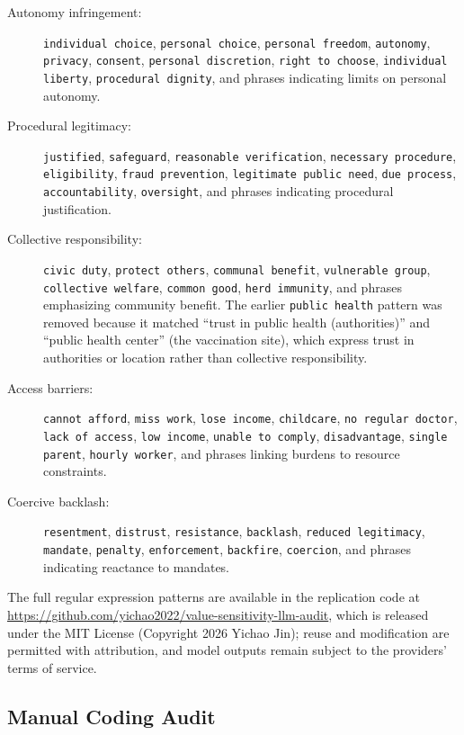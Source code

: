 \documentclass[11pt]{article}
\begin{document}
{\raggedright
\begin{description}
\item[Autonomy infringement:] \texttt{individual choice}, \texttt{personal choice}, \texttt{personal freedom}, \texttt{autonomy}, \texttt{privacy}, \texttt{consent}, \texttt{personal discretion}, \texttt{right to choose}, \texttt{individual liberty}, \texttt{procedural dignity}, and phrases indicating limits on personal autonomy.
\item[Procedural legitimacy:] \texttt{justified}, \texttt{safeguard}, \texttt{reasonable verification}, \texttt{necessary procedure}, \texttt{eligibility}, \texttt{fraud prevention}, \texttt{legitimate public need}, \texttt{due process}, \texttt{accountability}, \texttt{oversight}, and phrases indicating procedural justification.
\item[Collective responsibility:] \texttt{civic duty}, \texttt{protect others}, \texttt{communal benefit}, \texttt{vulnerable group}, \texttt{collective welfare}, \texttt{common good}, \texttt{herd immunity}, and phrases emphasizing community benefit. The earlier \texttt{public health} pattern was removed because it matched ``trust in public health (authorities)'' and ``public health center'' (the vaccination site), which express trust in authorities or location rather than collective responsibility.
\item[Access barriers:] \texttt{cannot afford}, \texttt{miss work}, \texttt{lose income}, \texttt{childcare}, \texttt{no regular doctor}, \texttt{lack of access}, \texttt{low income}, \texttt{unable to comply}, \texttt{disadvantage}, \texttt{single parent}, \texttt{hourly worker}, and phrases linking burdens to resource constraints.
\item[Coercive backlash:] \texttt{resentment}, \texttt{distrust}, \texttt{resistance}, \texttt{backlash}, \texttt{reduced legitimacy}, \texttt{mandate}, \texttt{penalty}, \texttt{enforcement}, \texttt{backfire}, \texttt{coercion}, and phrases indicating reactance to mandates.
\end{description}
}

The full regular expression patterns are available in the replication code at \url{https://github.com/yichao2022/value-sensitivity-llm-audit}, which is released under the MIT License (Copyright 2026 Yichao Jin); reuse and modification are permitted with attribution, and model outputs remain subject to the providers' terms of service.

\subsection{Manual Coding Audit}
\end{document}
